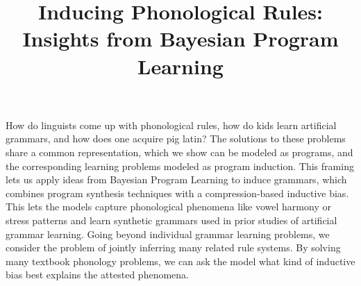 \documentclass{article}
\title{Inducing Phonological Rules: Insights from Bayesian Program Learning}
\begin{document}
\maketitle


How do linguists come up with phonological rules, how do kids learn
artificial grammars, and how does one acquire pig latin?  The
solutions to these problems share a common representation, which we
show can be modeled as programs, and the corresponding learning
problems modeled as program induction.  This framing lets us apply
ideas from Bayesian Program Learning to induce grammars, which
combines program synthesis techniques with a compression-based inductive
bias. This lets the models capture phonological phenomena like vowel
harmony or stress patterns and learn synthetic grammars used in prior
studies of artificial grammar learning.  Going beyond individual
grammar learning problems, we consider the problem of jointly
inferring many related rule systems. By solving many textbook
phonology problems, we can ask the model what kind of inductive bias
best explains the attested phenomena.
\end{document}
